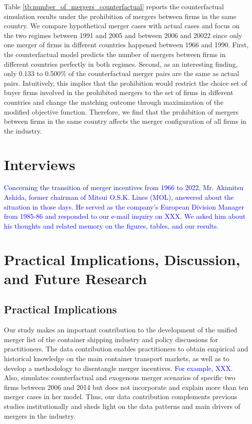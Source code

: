 \documentclass[10pt]{article}
\begin{document}
Table \ref{tb:number_of_mergers_counterfactual} reports the counterfactual simulation results under the prohibition of mergers between firms in the same country. 
We compare hypothetical merger cases with actual cases and focus on the two regimes between 1991 and 2005 and between 2006 and 20022 since only one merger of firms in different countries happened between 1966 and 1990.
First, the counterfactual model predicts the number of mergers between firms in different countries perfectly in both regimes. 
Second, as an interesting finding, only 0.133 to 0.500\% of the counterfactual merger pairs are the same as actual pairs.
Intuitively, this implies that the prohibition would restrict the choice set of buyer firms involved in the prohibited mergers to the set of firms in different countries and change the matching outcome through maximization of the modified objective function.
Therefore, we find that the prohibition of mergers between firms in the same country affects the merger configuration of all firms in the industry.




\section{Interviews}\label{sec:interviews}

\textcolor{blue}{Concerning the transition of merger incentives from 1966 to 2022, Mr.
Akimitsu Ashida, former chairman of Mitsui O.S.K. Lines (MOL), answered about the situation in those days. He served as the company’s European Division Manager from 1985-86 and responded
to our e-mail inquiry on XXX. We asked him about his thoughts and related memory on the figures, tables, and our results.}



\section{Practical Implications, Discussion, and Future Research}\label{sec:practical_implications}

\subsection{Practical Implications}

Our study makes an important contribution to the development of the unified merger list of the container shipping industry and policy discussions for practitioners. 
The data contribution enables practitioners to obtain empirical and historical knowledge on the main container transport markets, as well as to develop a methodology to disentangle merger incentives.
\textcolor{blue}{For example, XXX.} Also, \cite{jeon2022learning} simulates counterfactual and exogenous merger scenarios of specific two firms between 2006 and 2014 but does not incorporate and explain more than ten merger cases in her model.
Thus, our data contribution complements previous studies institutionally and sheds light on the data patterns and main drivers of mergers in the industry.
\end{document}
